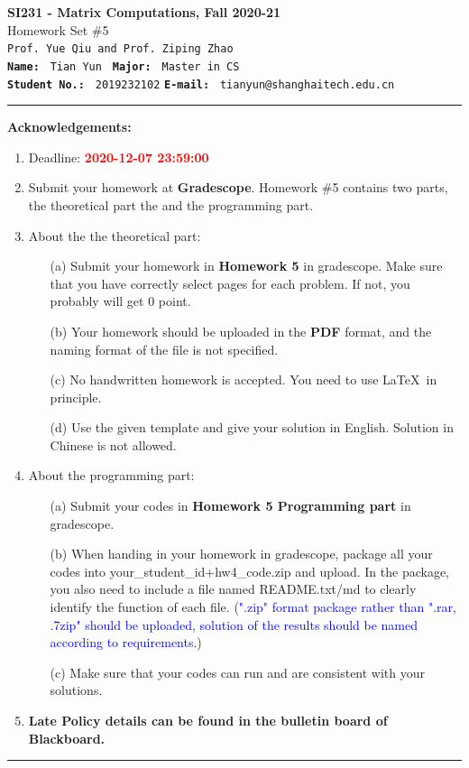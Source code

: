 \documentclass[english,onecolumn]{IEEEtran}
\begin{document}
\begin{center}
	\textbf{\LARGE{SI231 - Matrix Computations, Fall 2020-21}}\\
	{\Large Homework Set \#5}\\
	\texttt{Prof. Yue Qiu and Prof. Ziping Zhao}\\
	\texttt{\textbf{Name:}}   	\texttt{ Tian Yun }  		\hspace{1bp}
	\texttt{\textbf{Major:}}  	\texttt{ Master in CS } 	\\
	\texttt{\textbf{Student No.:}} 	\texttt{ 2019232102}     \hspace{1bp}
	\texttt{\textbf{E-mail:}} 	\texttt{ tianyun@shanghaitech.edu.cn}
\par\end{center}

\noindent
\rule{\linewidth}{0.4pt}
{\bf {\large Acknowledgements:}}
\begin{enumerate}
    \item Deadline: \textcolor{red}{\textbf{2020-12-07 23:59:00}}
    \item Submit your homework at \textbf{Gradescope}.
    Homework \#5 contains two parts, the theoretical part the and the programming part.
    \item About the the theoretical part:
    \begin{enumerate}
            \item[(a)] Submit your homework in \textbf{Homework 5} in gradescope. Make sure that you have correctly select pages for each problem. If not, you probably will get 0 point.
            \item[(b)] Your homework should be uploaded in the \textbf{PDF} format, and the naming format of the file is not specified.
            \item[(c)] No handwritten homework is accepted. You need to use \LaTeX $\,$ in principle.
            \item[(d)] Use the given template and give your solution in English. Solution in Chinese is not allowed. 
        \end{enumerate}
  \item About the programming part:
  \begin{enumerate}
      \item[(a)] Submit your codes in \textbf{Homework 5 Programming part} in gradescope. 
      \item[(b)] When handing in your homework in gradescope, package all your codes into {\sf your\_student\_id+hw4\_code.zip} and upload. In the package, you also need to include a file named {\sf README.txt/md} to clearly identify the function of each file. (\textcolor{blue}{".zip" format package rather than ".rar, .7zip" should be uploaded, solution of the results should be named according to requirements}.)
     \item[(c)] Make sure that your codes can run and are consistent with your solutions.
  \end{enumerate}
  \item \textbf{Late Policy details can be found in the bulletin board of Blackboard.}
\end{enumerate}
\rule{\linewidth}{0.4pt}
\end{document}
